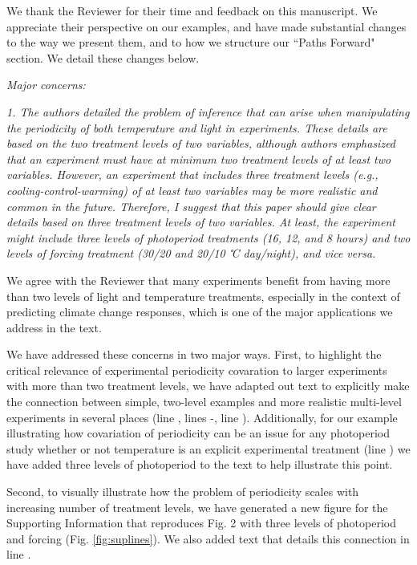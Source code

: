 \documentclass[11pt]{article}
\begin{document}
We thank the Reviewer for their time and feedback on this manuscript. We appreciate their perspective on our examples, and have made substantial changes to the way we present them, and to how we structure our ``Paths Forward" section. We detail these changes below.

\emph{Major concerns:}

\emph{1. The authors detailed the problem of inference that can arise when manipulating the periodicity of both temperature and light in experiments. These details are based on the two treatment levels of two variables, although authors emphasized that an experiment must have at minimum two treatment levels of at least two variables. However, an experiment that includes three treatment levels (e.g., cooling-control-warming) of at least two variables may be more realistic and common in the future. Therefore, I suggest that this paper should give clear details based on three treatment levels of two variables. At least, the experiment might include three levels of photoperiod treatments (16, 12, and 8 hours) and two levels of forcing treatment (30/20 and 20/10 ℃ day/night), and vice versa.}

We agree with the Reviewer that many experiments benefit from having more than two levels of light and temperature treatments, especially in the context of predicting climate change responses, which is one of the major applications we address in the text.

We have addressed these concerns in two major ways. First, to highlight the critical relevance of experimental periodicity covaration to larger experiments with more than two treatment levels, we have adapted out text to explicitly make the connection between simple, two-level examples and more realistic multi-level experiments in several places (line , lines -, line ). Additionally, for our example illustrating how covariation of periodicity can be an issue for any photoperiod study whether or not temperature is an explicit experimental treatment (line ) we have added three levels of photoperiod to the text to help illustrate this point. 

Second, to visually illustrate how the problem of periodicity scales with increasing number of treatment levels, we have generated a new figure for the Supporting Information that reproduces Fig. 2 with three levels of photoperiod and forcing (Fig. \ref{fig:suplines}). We also added text that details this connection in line .
\end{document}
